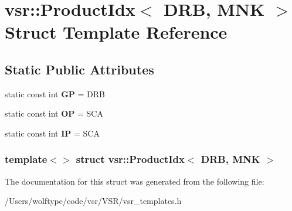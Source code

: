 \hypertarget{structvsr_1_1_product_idx_3_01_d_r_b_00_01_m_n_k_01_4}{\section{vsr\-:\-:Product\-Idx$<$ D\-R\-B, M\-N\-K $>$ Struct Template Reference}
\label{structvsr_1_1_product_idx_3_01_d_r_b_00_01_m_n_k_01_4}
}
\subsection*{Static Public Attributes}
\begin{DoxyCompactItemize}
\item 
\hypertarget{structvsr_1_1_product_idx_3_01_d_r_b_00_01_m_n_k_01_4_a2dbc8eafb30c0c686d1a2ec594026161}{static const int {\bfseries G\-P} = D\-R\-B}\label{structvsr_1_1_product_idx_3_01_d_r_b_00_01_m_n_k_01_4_a2dbc8eafb30c0c686d1a2ec594026161}

\item 
\hypertarget{structvsr_1_1_product_idx_3_01_d_r_b_00_01_m_n_k_01_4_afecfffb5213c10148528336bba246567}{static const int {\bfseries O\-P} = S\-C\-A}\label{structvsr_1_1_product_idx_3_01_d_r_b_00_01_m_n_k_01_4_afecfffb5213c10148528336bba246567}

\item 
\hypertarget{structvsr_1_1_product_idx_3_01_d_r_b_00_01_m_n_k_01_4_ab33ad5f2e1d16b6547d18a3466f647e3}{static const int {\bfseries I\-P} = S\-C\-A}\label{structvsr_1_1_product_idx_3_01_d_r_b_00_01_m_n_k_01_4_ab33ad5f2e1d16b6547d18a3466f647e3}

\end{DoxyCompactItemize}
\subsubsection*{template$<$$>$ struct vsr\-::\-Product\-Idx$<$ D\-R\-B, M\-N\-K $>$}



The documentation for this struct was generated from the following file\-:\begin{DoxyCompactItemize}
\item 
/\-Users/wolftype/code/vsr/\-V\-S\-R/vsr\-\_\-templates.\-h\end{DoxyCompactItemize}
